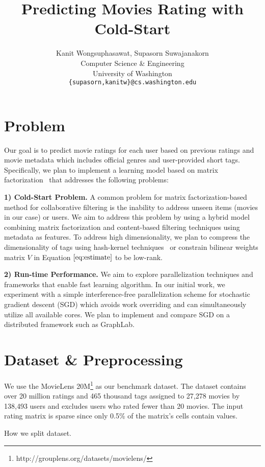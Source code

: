 \documentclass{article} %
\title{Predicting Movies Rating with Cold-Start}
\author{
	Kanit Wongsuphasawat, Supasorn Suwajanakorn \\
	Computer Science \& Engineering\\
	University of Washington\\
	\texttt{\{supasorn,kanitw\}@cs.washington.edu} \\
}
\begin{document}
	\maketitle

\section{Problem}
Our goal is to predict movie ratings for each user based on previous ratings and movie metadata which includes official genres and user-provided short tags.  Specifically, we plan to implement a learning model based on matrix factorization~\cite{koren:matrix} that addresses the following problems:

\textbf{1) Cold-Start Problem.} A common problem for matrix factorization-based method for collaborative filtering is the inability to address unseen items (movies in our case) or users.  We aim to address this problem by using a hybrid model combining matrix factorization and content-based filtering techniques using metadata as features. To address high dimensionality, we plan to compress the dimensionality of tags using hash-kernel techniques~\cite{shi:hashkernels} or constrain bilinear weights matrix $V$ in Equation $\ref{eq:estimate}$ to be low-rank.

\textbf{2) Run-time Performance.} We aim to explore parallelization techniques and frameworks that enable fast learning algorithm.  In our initial work, we experiment with a simple interference-free parallelization scheme for stochastic gradient descent (SGD) which avoids work overriding and can simultaneously utilize all available cores. We plan to implement and compare SGD on a distributed framework such as GraphLab.


\section{Dataset \& Preprocessing}
We use the MovieLens 20M\footnote{http://grouplens.org/datasets/movielens/}
as our benchmark dataset.  The dataset contains over 20 million ratings and 465 thousand tags assigned to 27,278 movies by 138,493 users and excludes users who rated fewer than 20 movies. The input rating matrix is sparse since only 0.5\% of the matrix's cells contain values.

How we split dataset.
\end{document}
